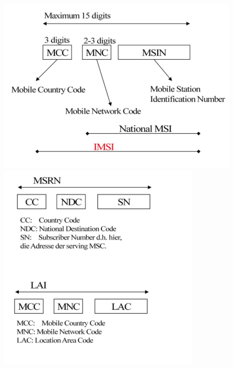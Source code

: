 \begin{minipage}{0.4 \linewidth}
\includegraphics[width =  \linewidth]{./Pics/GSMITMSI} 
\includegraphics[width =  \linewidth]{./Pics/GSMMSRNUndLAI} 

\end{minipage}
